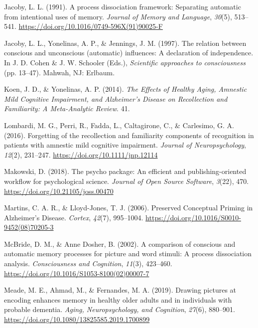 \documentclass[
  11pt,
]{article}
\begin{document}
\leavevmode\hypertarget{ref-jacoby1991}{}%
Jacoby, L. L. (1991). A process dissociation framework: Separating
automatic from intentional uses of memory. \emph{Journal of Memory and
Language}, \emph{30}(5), 513--541.
\url{https://doi.org/10.1016/0749-596X(91)90025-F}

\leavevmode\hypertarget{ref-jacoby1997}{}%
Jacoby, L. L., Yonelinas, A. P., \& Jennings, J. M. (1997). The relation
between conscious and unconscious (automatic) influences: A declaration
of independence. In J. D. Cohen \& J. W. Schooler (Eds.),
\emph{Scientific approaches to consciousness} (pp. 13--47). Mahwah, NJ:
Erlbaum.

\leavevmode\hypertarget{ref-koen2014}{}%
Koen, J. D., \& Yonelinas, A. P. (2014). \emph{The Effects of Healthy
Aging, Amnestic Mild Cognitive Impairment, and Alzheimer's Disease on
Recollection and Familiarity: A Meta-Analytic Review}. 41.

\leavevmode\hypertarget{ref-lombardi2016}{}%
Lombardi, M. G., Perri, R., Fadda, L., Caltagirone, C., \& Carlesimo, G.
A. (2016). Forgetting of the recollection and familiarity components of
recognition in patients with amnestic mild cognitive impairment.
\emph{Journal of Neuropsychology}, \emph{12}(2), 231--247.
\url{https://doi.org/10.1111/jnp.12114}

\leavevmode\hypertarget{ref-psycho}{}%
Makowski, D. (2018). The psycho package: An efficient and
publishing-oriented workflow for psychological science. \emph{Journal of
Open Source Software}, \emph{3}(22), 470.
\url{https://doi.org/10.21105/joss.00470}

\leavevmode\hypertarget{ref-martins2006}{}%
Martins, C. A. R., \& Lloyd-Jones, T. J. (2006). Preserved Conceptual
Priming in Alzheimer's Disease. \emph{Cortex}, \emph{42}(7), 995--1004.
\url{https://doi.org/10.1016/S0010-9452(08)70205-3}

\leavevmode\hypertarget{ref-mcbride2002}{}%
McBride, D. M., \& Anne Dosher, B. (2002). A comparison of conscious and
automatic memory processes for picture and word stimuli: A process
dissociation analysis. \emph{Consciousness and Cognition}, \emph{11}(3),
423--460. \url{https://doi.org/10.1016/S1053-8100(02)00007-7}

\leavevmode\hypertarget{ref-meade2019}{}%
Meade, M. E., Ahmad, M., \& Fernandes, M. A. (2019). Drawing pictures at
encoding enhances memory in healthy older adults and in individuals with
probable dementia. \emph{Aging, Neuropsychology, and Cognition},
\emph{27}(6), 880--901.
\url{https://doi.org/10.1080/13825585.2019.1700899}
\end{document}
